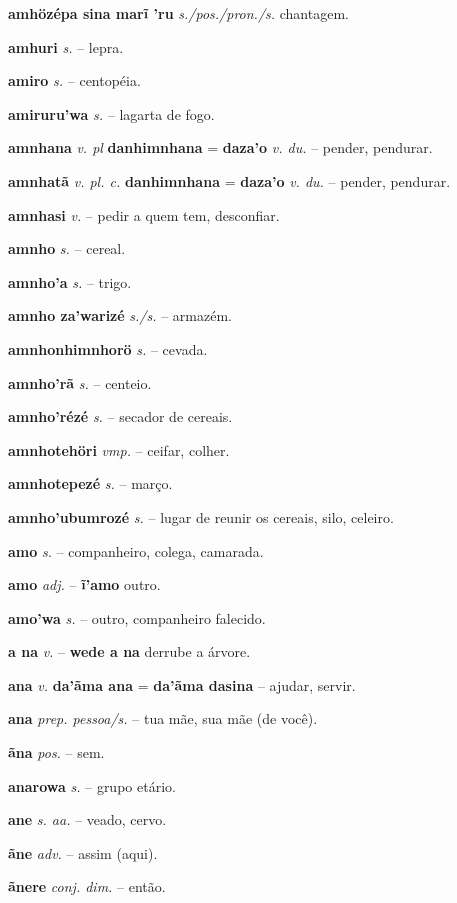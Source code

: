 \textbf{amhözépa sina marĩ 'ru} \textit{s./pos./pron./s.} chantagem.

\textbf{amhuri} \textit{s.} -- lepra.

\textbf{amiro} \textit{s.} -- centopéia.

\textbf{amiruru'wa} \textit{s.} -- lagarta de fogo.

\textbf{amnhana} \textit{v. pl} \textbf{danhimnhana} = \textbf{daza'o} \textit{v. du.} -- pender, pendurar.

\textbf{amnhatã} \textit{v. pl. c.} \textbf{danhimnhana} = \textbf{daza'o} \textit{v. du.} -- pender, pendurar.

\textbf{amnhasi} \textit{v.} -- pedir a quem tem, desconfiar.

\textbf{amnho} \textit{s.} -- cereal.

\textbf{amnho'a} \textit{s.} -- trigo.

\textbf{amnho za'warizé} \textit{s./s.} -- armazém.

\textbf{amnhonhimnhorö} \textit{s.} -- cevada.

\textbf{amnho'rã} \textit{s.} -- centeio.

\textbf{amnho'rézé} \textit{s.} -- secador de cereais.

\textbf{amnhotehöri} \textit{vmp.} -- ceifar, colher.

\textbf{amnhotepezé} \textit{s.} -- março.

\textbf{amnho'ubumrozé} \textit{s.} -- lugar de reunir os cereais, silo, celeiro.

\textbf{amo} \textit{s.} -- companheiro, colega, camarada.

\textbf{amo} \textit{adj.} -- \textbf{ĩ'amo} outro.

\textbf{amo'wa} \textit{s.} -- outro, companheiro falecido.

\textbf{a na} \textit{v.} -- \textbf{wede a na} derrube a árvore.

\textbf{ana} \textit{v.} \textbf{da'ãma ana} = \textbf{da'ãma dasina} -- ajudar, servir.

\textbf{ana} \textit{prep. pessoa/s.} -- tua mãe, sua mãe (de você).

\textbf{ãna} \textit{pos.} -- sem.

\textbf{anarowa} \textit{s.} -- grupo etário.

\textbf{ane} \textit{s. aa.} -- veado, cervo.

\textbf{ãne} \textit{adv.} -- assim (aqui).

\textbf{ãnere} \textit{conj. dim.} -- então.


